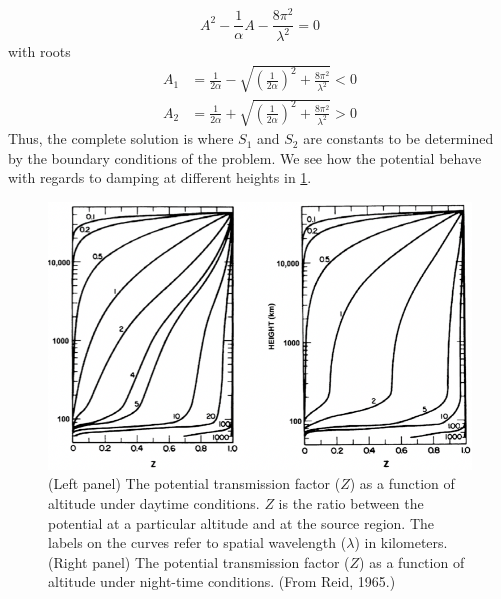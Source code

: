 \begin{equation*}
    A^2-\frac{1}{\alpha}A-\frac{8\pi^2}{\lambda^2}=0
\end{equation*}
with roots
\begin{align*}
    A_1&=\frac{1}{2\alpha}-\sqrt{{\left(\frac{1}{2\alpha}\right)}^2+\frac{8\pi^2}{\lambda^2}}<0\\
    A_2&=\frac{1}{2\alpha}+\sqrt{{\left(\frac{1}{2\alpha}\right)}^2+\frac{8\pi^2}{\lambda^2}}>0
\end{align*}
Thus, the complete solution is
where \(S_1\) and \(S_2\) are constants to be determined by the boundary conditions of the problem. We see how the potential behave with regards to damping at different heights in \cref{fig:L14_electric_potential}.
\begin{figure}[t]
    \centering
    \includegraphics[width=.8\linewidth]{bilder/L14_electric_potential.png}
    \caption{(Left panel) The potential transmission factor (\(Z\)) as a function of altitude under daytime conditions. \(Z\) is the ratio between the potential at a particular altitude and at the source region. The labels on the curves refer to spatial wavelength (\(\lambda \)) in kilometers. (Right panel) The potential transmission factor (\(Z\)) as a function of altitude under night-time conditions. (From Reid, 1965.)}\label{fig:L14_electric_potential}
\end{figure}